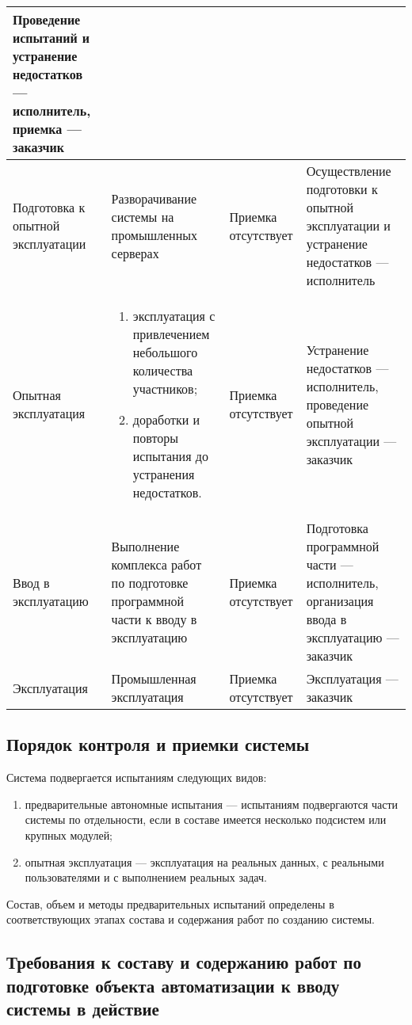\begin{center}
\begin{longtable}{|p{3.9cm}|p{4.4cm}|p{3cm}|p{3.4cm}|}
Проведение испытаний и устранение недостатков — исполнитель, приемка — заказчик\\
\hline
Подготовка к опытной эксплуатации&
Разворачивание системы на промышленных серверах&
Приемка отсутствует&
Осуществление подготовки к опытной эксплуатации и устранение недостатков — исполнитель\\
\hline
Опытная эксплуатация&
\begin{enumerate} 
  \item эксплуатация с привлечением небольшого количества участников;
  \item доработки и повторы испытания до устранения недостатков.
\end{enumerate}&
Приемка отсутствует&
Устранение недостатков — исполнитель, проведение опытной эксплуатации — заказчик\\
\hline
Ввод в эксплуатацию&
Выполнение комплекса работ по подготовке программной части к вводу в эксплуатацию&
Приемка отсутствует&
Подготовка программной части — исполнитель, организация ввода в эксплуатацию — заказчик\\
\hline
Эксплуатация&
Промышленная эксплуатация&
Приемка отсутствует&
Эксплуатация — заказчик\\
\hline
\end{longtable}
\end{center}

\subsection{Порядок контроля и приемки системы}

Система подвергается испытаниям следующих видов:

\begin{enumerate} 
  \item предварительные автономные испытания — испытаниям подвергаются части системы по отдельности, если в составе имеется несколько подсистем или крупных модулей;
  
  \item опытная эксплуатация — эксплуатация на реальных данных, с реальными пользователями и с выполнением реальных задач.
\end{enumerate}

Состав, объем и методы предварительных испытаний определены в соответствующих этапах состава и содержания работ по созданию системы.

\subsection{Требования к составу и содержанию работ по подготовке объекта автоматизации к вводу системы в действие}

